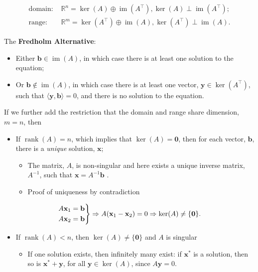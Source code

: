 \documentclass[12pt, twoside, draft]{article}
\begin{document}
\begin{align}\label{eq:domain_range_LE}
\text{domain: } & \mathbb{R}^n = \ker(A) \oplus \operatorname{im}(A^\top), \ker(A) \perp \operatorname{im}(A^\top); \\
\text{range: } & \mathbb{R}^m = \ker(A^\top) \oplus \operatorname{im}(A), \ker(A^\top) \perp \operatorname{im}(A). 
\end{align}

The \textbf{Fredholm Alternative}:
\begin{itemize}[noitemsep]
\item Either $\mathbf{b} \in \operatorname{im}(A)$, in which case there is at least one solution to the equation;
\item Or $\mathbf{b} \notin \operatorname{im}(A)$, in which case there is at least one vector, $\mathbf{y} \in \ker (A^\top)$, such that $\langle \mathbf{y}, \mathbf{b} \rangle = 0$, and there is no solution to the equation.
\end{itemize}
If we further add the restriction that the domain and range share dimension, $m = n$, then
\begin{itemize}[noitemsep]
\item If $\operatorname{rank}(A) = n$, which implies that $\ker(A) = {\mathbf{0}}$, then for each vector, $\mathbf{b}$, there is a \textit{unique} solution, $\mathbf{x}$;
\begin{itemize}[noitemsep]
\item The matrix, $A$, is non-singular and here exists a unique inverse matrix, $A^{-1}$, such that $\mathbf{x} = A^{-1} \mathbf{b}$ .
\item Proof of uniqueness by contradiction
\end{itemize} 
\end{itemize}
\begin{equation}\label{eq:LE_unique_solution}
\begin{rcases}
A \mathbf{x}_1 = \mathbf{b} \\
A \mathbf{x}_2 = \mathbf{b}
\end{rcases}
\Rightarrow A(\mathbf{x}_1 - \mathbf{x}_2) = 0 \Rightarrow \ker(A) \neq \{\mathbf{0}\} .
\end{equation}
\begin{itemize}
\item If $\operatorname{rank}(A) < n$, then $\ker(A) \neq \{\mathbf{0}\}$ and $A$ is singular
\begin{itemize}
\item If one solution exists, then infinitely many exist: if $\mathbf{x}^*$ is a solution, then so is $\mathbf{x}^* + \mathbf{y}$, for all $\mathbf{y} \in \ker(A)$, since $A\mathbf{y} = 0$.
\end{itemize}
\end{itemize}
\end{document}
